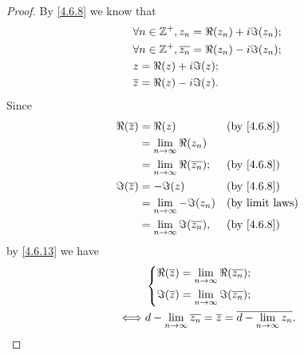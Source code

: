 \begin{proof}
  By \cref{4.6.8} we know that
  \begin{align*}
     & \forall n \in \mathbb{Z}^+, z_n = \Re(z_n) + i \Im(z_n);            \\
     & \forall n \in \mathbb{Z}^+, \overline{z_n} = \Re(z_n) - i \Im(z_n); \\
     & z = \Re(z) + i \Im(z);                                      \\
     & \overline{z} = \Re(z) - i \Im(z).
  \end{align*}
  Since
  \begin{align*}
    \Re(\overline{z}) & = \Re(z)                                   &  & \text{(by \cref{4.6.8})} \\
                      & = \lim_{n \to \infty} \Re(z_n)                                           \\
                      & = \lim_{n \to \infty} \Re(\overline{z_n}); &  & \text{(by \cref{4.6.8})} \\
    \Im(\overline{z}) & = -\Im(z)                                  &  & \text{(by \cref{4.6.8})} \\
                      & = \lim_{n \to \infty} -\Im(z_n)            &  & \text{(by limit laws)}   \\
                      & = \lim_{n \to \infty} \Im(\overline{z_n}), &  & \text{(by \cref{4.6.8})}
  \end{align*}
  by \cref{4.6.13} we have
  \begin{align*}
         & \begin{dcases}
             \Re(\overline{z}) = \lim_{n \to \infty} \Re(\overline{z_n}); \\
             \Im(\overline{z}) = \lim_{n \to \infty} \Im(\overline{z_n});
           \end{dcases}                                    \\
    \iff & d - \lim_{n \to \infty} \overline{z_n} = \overline{z} = \overline{d - \lim_{n \to \infty} z_n}.
  \end{align*}


\end{proof}
